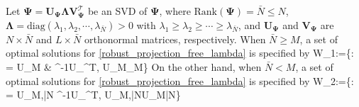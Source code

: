 \documentclass[final,5p,times,twocolumn]{elsarticle}
\begin{document}
\begin{theorem}\label{lemma_1}
	Let $\bm\Psi=\bm U_{\bm\Psi}\bm \Lambda\bm V_{\bm\Psi}^\mathcal T$ be an SVD of $\bm\Psi$, where $\text{Rank}(\bm\Psi)=\bar N\leq N$, $\bm\Lambda=\text{diag}(\lambda_1,\lambda_2,\cdots,\lambda_{\bar N})>0$ with $\lambda_1\geq\lambda_2\geq\cdots\geq\lambda_{\bar N}$, and $\bm U_{\bm \Psi}$ and $\bm V_{\bm \Psi}$ are $N\times \bar N$ and $L\times \bar N$ orthonormal matrices, respectively. When $\bar N\geq M$, a set of optimal solutions for \eqref{robust_projection_free_lambda} is specified by
	\e
	{\cal W}_1:=\left\{\bm\Phi: \bm\Phi= \bmat \bm U_M & \emat \bm\Lambda^{-1}\bm U_{\bm \Psi}^\mathcal T, \bm U_M_M\right\}
	\label{optimal_robust_projection_free_lambda}
	\ee
	On the other hand, when $\bar N< M$,  a set of optimal solutions for \eqref{robust_projection_free_lambda} is specified by
	\e
	{\cal W}_2:=\left\{\bm\Phi: \bm\Phi= \bm U_{M,\bar N} \bm\Lambda^{-1}\bm U_{\bm \Psi}^\mathcal T, \bm U_{M,\bar N}\in\mathcal U_{M\times \bar N}\right\}
	\label{optimal_robust_projection_free_lambda 2}
	\ee
\end{theorem}
\end{document}

